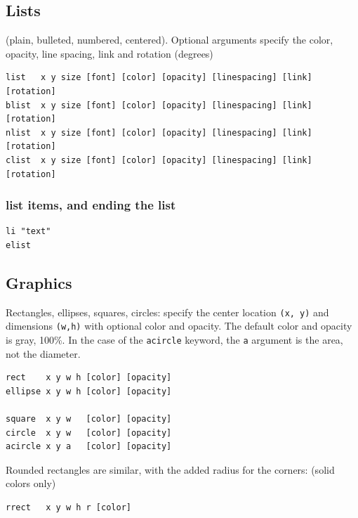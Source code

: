 \hypertarget{lists}{%
\subsection{Lists}\label{lists}}

(plain, bulleted, numbered, centered). Optional arguments specify the
color, opacity, line spacing, link and rotation (degrees)

\begin{verbatim}
list   x y size [font] [color] [opacity] [linespacing] [link] [rotation]
blist  x y size [font] [color] [opacity] [linespacing] [link] [rotation]
nlist  x y size [font] [color] [opacity] [linespacing] [link] [rotation]
clist  x y size [font] [color] [opacity] [linespacing] [link] [rotation]
\end{verbatim}

\hypertarget{list-items-and-ending-the-list}{%
\subsubsection{list items, and ending the
list}\label{list-items-and-ending-the-list}}

\begin{verbatim}
li "text"
elist
\end{verbatim}

\hypertarget{graphics}{%
\subsection{Graphics}\label{graphics}}

Rectangles, ellipses, squares, circles: specify the center location
\texttt{(x,\ y)} and dimensions \texttt{(w,h)} with optional color and
opacity. The default color and opacity is gray, 100\%. In the case of
the \texttt{acircle} keyword, the \texttt{a} argument is the area, not
the diameter.

\begin{verbatim}
rect    x y w h [color] [opacity]
ellipse x y w h [color] [opacity]

square  x y w   [color] [opacity]
circle  x y w   [color] [opacity]
acircle x y a   [color] [opacity]
\end{verbatim}

Rounded rectangles are similar, with the added radius for the corners:
(solid colors only)

\begin{verbatim}
rrect   x y w h r [color]
\end{verbatim}

